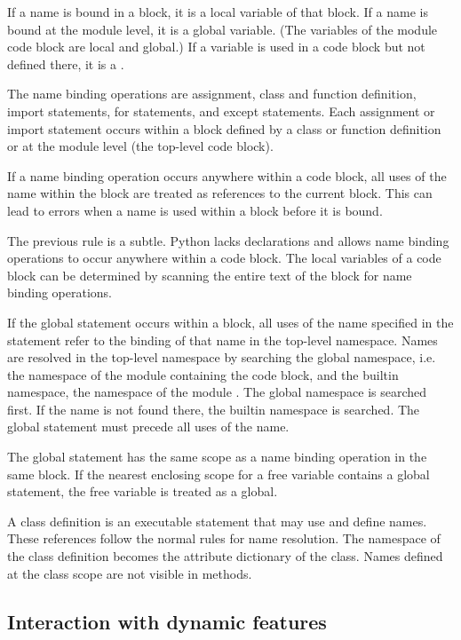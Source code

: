 If a name is bound in a block, it is a local variable of that block.
If a name is bound at the module level, it is a global variable.  (The
variables of the module code block are local and global.)  If a
variable is used in a code block but not defined there, it is a
.

The name binding operations are assignment, class and function
definition, import statements, for statements, and except statements.
Each assignment or import statement occurs within a block defined by a
class or function definition or at the module level (the top-level
code block).

If a name binding operation occurs anywhere within a code block, all
uses of the name within the block are treated as references to the
current block.  This can lead to errors when a name is used within a
block before it is bound.

The previous rule is a subtle.  Python lacks declarations and allows
name binding operations to occur anywhere within a code block.  The
local variables of a code block can be determined by scanning the
entire text of the block for name binding operations.

If the global statement occurs within a block, all uses of the name
specified in the statement refer to the binding of that name in the
top-level namespace.  Names are resolved in the top-level namespace by
searching the global namespace, i.e. the namespace of the module
containing the code block, and the builtin namespace, the namespace of
the module .  The global namespace is searched
first.  If the name is not found there, the builtin namespace is
searched.  The global statement must precede all uses of the name.

The global statement has the same scope as a name binding operation
in the same block.  If the nearest enclosing scope for a free variable
contains a global statement, the free variable is treated as a global.

A class definition is an executable statement that may use and define
names.  These references follow the normal rules for name resolution.
The namespace of the class definition becomes the attribute dictionary
of the class.  Names defined at the class scope are not visible in
methods. 

\subsection{Interaction with dynamic features \label{dynamic-features}}

